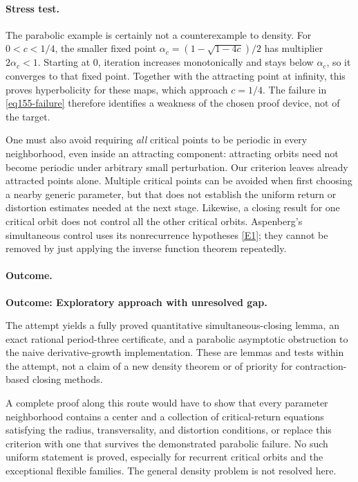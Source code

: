 \documentclass[11pt,a4paper]{article}
\newcommand{\eref}[2]{\hyperlink{extra:#1:#2}{[E#2]}}
\numberwithin{equation}{section}
\begin{document}
\paragraph{Stress test.}
The parabolic example is certainly not a counterexample to density. For
$0<c<1/4$, the smaller fixed point
$\alpha_c=(1-\sqrt{1-4c})/2$ has multiplier $2\alpha_c<1$.
Starting at $0$, iteration increases monotonically and stays below
$\alpha_c$, so it converges to that fixed point. Together with the
attracting point at infinity, this proves hyperbolicity for these maps,
which approach $c=1/4$. The failure in \eqref{eq155-failure} therefore
identifies a weakness of the chosen proof device, not of the target.

One must also avoid requiring \emph{all} critical points to be periodic in
every neighborhood, even inside an attracting component: attracting
orbits need not become periodic under arbitrary small perturbation. Our
criterion leaves already attracted points alone. Multiple critical points
can be avoided when first choosing a nearby generic parameter, but that
does not establish the uniform return or distortion estimates needed at
the next stage. Likewise, a closing result for one critical orbit does not
control all the other critical orbits. Aspenberg's simultaneous control
uses its nonrecurrence hypotheses \eref{155}{1}; they cannot be removed
by just applying the inverse function theorem repeatedly.

\paragraph{Outcome.}
\textbf{Outcome: Exploratory approach with unresolved gap.}

The attempt yields a fully proved quantitative simultaneous-closing lemma,
an exact rational period-three certificate, and a parabolic asymptotic
obstruction to the naive derivative-growth implementation. These are
lemmas and tests within the attempt, not a claim of a new density theorem
or of priority for contraction-based closing methods.

A complete proof along this route would have to show that every parameter
neighborhood contains a center and a collection of critical-return equations
satisfying the radius, transversality, and distortion conditions, or replace
this criterion with one that survives the demonstrated parabolic failure.
No such uniform statement is proved, especially for recurrent critical
orbits and the exceptional flexible families. The general density problem
is not resolved here.
\end{document}
